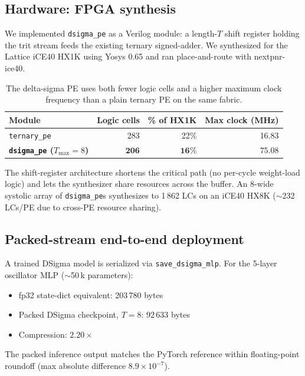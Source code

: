 \documentclass[11pt]{article}
\begin{document}
\subsection{Hardware: FPGA synthesis}

We implemented \texttt{dsigma\_pe} as a Verilog module: a length-$T$
shift register holding the trit stream feeds the existing ternary
signed-adder. We synthesized for the Lattice iCE40 HX1K using Yosys
0.65 and ran place-and-route with nextpnr-ice40.

\begin{table}[h]
\centering
\begin{tabular}{lrrr}
\toprule
Module & Logic cells & \% of HX1K & Max clock (MHz) \\
\midrule
\texttt{ternary\_pe} & 283 & 22\% & 16.83 \\
\textbf{\texttt{dsigma\_pe} ($T_{\max}=8$)} & $\mathbf{206}$ & $\mathbf{16\%}$ & $\mathbf{75.08}$ \\
\bottomrule
\end{tabular}
\caption{The delta-sigma PE uses both fewer logic cells and a higher
maximum clock frequency than a plain ternary PE on the same fabric.}
\end{table}

The shift-register architecture shortens the critical path (no
per-cycle weight-load logic) and lets the synthesizer share resources
across the buffer. An 8-wide systolic array of \texttt{dsigma\_pe}s
synthesizes to 1\,862 LCs on an iCE40 HX8K
($\sim$232 LCs/PE due to cross-PE resource sharing).

\subsection{Packed-stream end-to-end deployment}

A trained DSigma model is serialized via \texttt{save\_dsigma\_mlp}.
For the 5-layer oscillator MLP ($\sim$50\,k parameters):

\begin{itemize}
  \item fp32 state-dict equivalent: 203\,780 bytes
  \item Packed DSigma checkpoint, $T=8$: 92\,633 bytes
  \item Compression: $2.20\times$
\end{itemize}

The packed inference output matches the PyTorch reference within
floating-point roundoff (max absolute difference
$8.9 \times 10^{-7}$).
\end{document}

